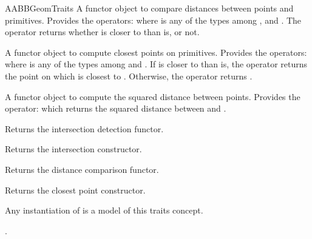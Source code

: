 \begin{ccRefConcept}{AABBGeomTraits}
{A functor object to compare distances between points and primitives.
Provides the operators:
where  is any of the types among ,  and . The operator returns whether  is closer to  than  is, or not.}

{A functor object to compute closest points on primitives.
Provides the operators:
where  is any of the types among  and . If  is closer to  than  is, the operator returns the point on  which is closest to . Otherwise, the operator returns .}

{A functor object to compute the squared distance between points. Provides the operator:
 which returns the squared distance between  and .}

\ccCreation
{}  %

\ccOperations

{Returns the intersection detection functor.}

{Returns the intersection constructor.}

{Returns the distance comparison functor.}

{Returns the closest point constructor.}

\ccHasModels
Any instantiation of  is a model of this traits concept.

\ccSeeAlso

.

\end{ccRefConcept}

\ccRefPageEnd

